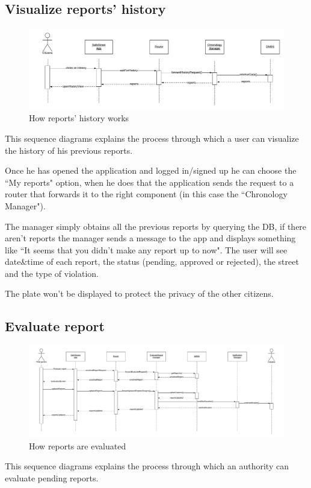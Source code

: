 \documentclass[12pt,a4paper]{report}
\begin{document}
			\subsection{Visualize reports' history}
				\begin{figure}[H]
						\includegraphics[width = \textwidth, center]{history}
						\caption{How reports' history works}
						\label{fig: diagrams}
				\end{figure}
				This sequence diagrams explains the process through which a user can visualize the history of his previous reports.


				Once he has opened the application and logged in/signed up he can choose the ``My reports" option,
				when he does that the application sends the request to a router that forwards it to the right
				component (in this case the ``Chronology Manager").


				The manager simply obtains all the previous reports by querying the DB, if there aren't reports the manager
				sends a message to the app and displays something like ``It seems that you didn't make any report up to now".
				The user will see date\&time of each report, the status (pending, approved or rejected), the street and the
				type of violation.


				The plate won't be displayed to protect the privacy of the other citizens.
			\subsection{Evaluate report}
				\begin{figure}[H]
						\includegraphics[width = \textwidth, center]{Evaluate}
						\caption{How reports are evaluated}
						\label{fig: diagrams}
				\end{figure}
				This sequence diagrams explains the process through which an authority can evaluate pending reports.
\end{document}
